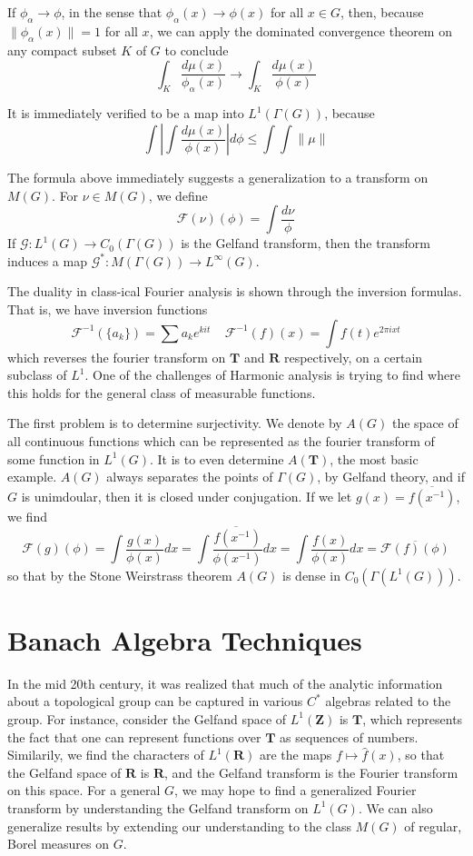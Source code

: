If $\phi_\alpha \to \phi$, in the sense that $\phi_\alpha(x) \to \phi(x)$ for all $x \in G$, then, because $\| \phi_\alpha(x) \| = 1$ for all $x$, we can apply the dominated convergence theorem on any compact subset $K$ of $G$ to conclude
%
\[ \int_K \frac{d\mu(x)}{\phi_\alpha(x)} \to \int_K \frac{d\mu(x)}{\phi(x)} \]

It is immediately verified to be a map into $L^1(\Gamma(G))$, because
%
\[ \int \left| \int \frac{d\mu(x)}{\phi(x)} \right| d\phi \leq \int \int \| \mu \| \]

The formula above immediately suggests a generalization to a transform on $M(G)$. For $\nu \in M(G)$, we define
%
\[ \mathcal{F}(\nu)(\phi) = \int \frac{d \nu}{\phi} \]
%
If $\mathcal{G}: L^1(G) \to C_0(\Gamma(G))$ is the Gelfand transform, then the transform induces a map $\mathcal{G}^* : M(\Gamma(G)) \to L^\infty(G)$.

The duality in class-ical Fourier analysis is shown through the inversion formulas. That is, we have inversion functions
\[ \mathcal{F}^{-1}(\{ a_k \}) = \sum a_k e^{kit}\ \ \ \ \ \mathcal{F}^{-1}(f)(x) = \int f(t) e^{2 \pi i x t} \]
%
which reverses the fourier transform on $\mathbf{T}$ and $\mathbf{R}$ respectively, on a certain subclass of $L^1$. One of the challenges of Harmonic analysis is trying to find where this holds for the general class of measurable functions.

The first problem is to determine surjectivity. We denote by $A(G)$ the space of all continuous functions which can be represented as the fourier transform of some function in $L^1(G)$. It is to even determine $A(\mathbf{T})$, the most basic example. $A(G)$ always separates the points of $\Gamma(G)$, by Gelfand theory, and if $G$ is unimdoular, then it is closed under conjugation. If we let $g(x) = \overline{f(x^{-1})}$, we find
%
\[ \mathcal{F}(g)(\phi) = \int \frac{g(x)}{\phi(x)} dx = \overline{ \int \frac{f(x^{-1})}{\phi(x^{-1})} dx } = \int \frac{f(x)}{\phi(x)} dx = \overline{\mathcal{F}(f)(\phi)} \]
%
so that by the Stone Weirstrass theorem $A(G)$ is dense in $C_0(\Gamma(L^1(G)))$.

\chapter{Banach Algebra Techniques}

In the mid 20th century, it was realized that much of the analytic information about a topological group can be captured in various $C^*$ algebras related to the group. For instance, consider the Gelfand space of $L^1(\mathbf{Z})$ is $\mathbf{T}$, which represents the fact that one can represent functions over $\mathbf{T}$ as sequences of numbers. Similarily, we find the characters of $L^1(\mathbf{R})$ are the maps $f \mapsto \widehat{f}(x)$, so that the Gelfand space of $\mathbf{R}$ is $\mathbf{R}$, and the Gelfand transform is the Fourier transform on this space. For a general $G$, we may hope to find a generalized Fourier transform by understanding the Gelfand transform on $L^1(G)$. We can also generalize results by extending our understanding to the class $M(G)$ of regular, Borel measures on $G$.

